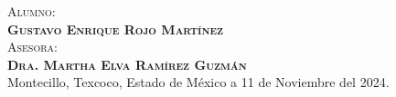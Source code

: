 \begin{titlepage}
\begin{minipage}[t][0.95\textheight][c]{0.76\textwidth}
\begin{center}
                \textsc{\large Alumno:}\\[0.3cm]
                \textbf{\textsc{\large {Gustavo Enrique Rojo Martínez}}}\\[2cm]
                {\large\scshape Asesora:\\[0.3cm]
                {\textbf{\large Dra. Martha Elva Ramírez Guzmán}}}\\[2.0cm]
                \large{Montecillo, Texcoco, Estado de México a 11 de Noviembre del 2024.}

            \end{center}
\end{minipage}
\end{titlepage}

\pagebreak[2]
